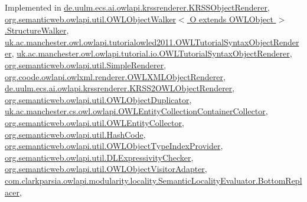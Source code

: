 Implemented in \hyperlink{classde_1_1uulm_1_1ecs_1_1ai_1_1owlapi_1_1krssrenderer_1_1_k_r_s_s_object_renderer_ae1bf57a75ca8f40f6acf0f48e40ccf86}{de.\-uulm.\-ecs.\-ai.\-owlapi.\-krssrenderer.\-K\-R\-S\-S\-Object\-Renderer}, \hyperlink{classorg_1_1semanticweb_1_1owlapi_1_1util_1_1_o_w_l_object_walker_3_01_o_01extends_01_o_w_l_object_01_4_1_1_structure_walker_ad449d316c36af493b88fbccca3876449}{org.\-semanticweb.\-owlapi.\-util.\-O\-W\-L\-Object\-Walker$<$ O extends O\-W\-L\-Object $>$.\-Structure\-Walker}, \hyperlink{classuk_1_1ac_1_1manchester_1_1owl_1_1owlapi_1_1tutorialowled2011_1_1_o_w_l_tutorial_syntax_object_renderer_a9e79e3a998be15e88453ee185bbe2148}{uk.\-ac.\-manchester.\-owl.\-owlapi.\-tutorialowled2011.\-O\-W\-L\-Tutorial\-Syntax\-Object\-Renderer}, \hyperlink{classuk_1_1ac_1_1manchester_1_1owl_1_1owlapi_1_1tutorial_1_1io_1_1_o_w_l_tutorial_syntax_object_renderer_ae4cc13da79d21148a3bd033bd24ebb44}{uk.\-ac.\-manchester.\-owl.\-owlapi.\-tutorial.\-io.\-O\-W\-L\-Tutorial\-Syntax\-Object\-Renderer}, \hyperlink{classorg_1_1semanticweb_1_1owlapi_1_1util_1_1_simple_renderer_a604a1895afc5cbf6e87283a19bb400ac}{org.\-semanticweb.\-owlapi.\-util.\-Simple\-Renderer}, \hyperlink{classorg_1_1coode_1_1owlapi_1_1owlxml_1_1renderer_1_1_o_w_l_x_m_l_object_renderer_accda238584363ee2657bc7f5abf729fb}{org.\-coode.\-owlapi.\-owlxml.\-renderer.\-O\-W\-L\-X\-M\-L\-Object\-Renderer}, \hyperlink{classde_1_1uulm_1_1ecs_1_1ai_1_1owlapi_1_1krssrenderer_1_1_k_r_s_s2_o_w_l_object_renderer_a151b662a8ef0dd90c7bc78a740248c9e}{de.\-uulm.\-ecs.\-ai.\-owlapi.\-krssrenderer.\-K\-R\-S\-S2\-O\-W\-L\-Object\-Renderer}, \hyperlink{classorg_1_1semanticweb_1_1owlapi_1_1util_1_1_o_w_l_object_duplicator_a68f9d86d2a723046c8980bc66b4d1648}{org.\-semanticweb.\-owlapi.\-util.\-O\-W\-L\-Object\-Duplicator}, \hyperlink{classuk_1_1ac_1_1manchester_1_1cs_1_1owl_1_1owlapi_1_1_o_w_l_entity_collection_container_collector_aed342aa606dff09f43b420703825aa47}{uk.\-ac.\-manchester.\-cs.\-owl.\-owlapi.\-O\-W\-L\-Entity\-Collection\-Container\-Collector}, \hyperlink{classorg_1_1semanticweb_1_1owlapi_1_1util_1_1_o_w_l_entity_collector_a141208c281d5e9982c40e2d322644272}{org.\-semanticweb.\-owlapi.\-util.\-O\-W\-L\-Entity\-Collector}, \hyperlink{classorg_1_1semanticweb_1_1owlapi_1_1util_1_1_hash_code_a644e06aba4f2a6a76767211b01c0afce}{org.\-semanticweb.\-owlapi.\-util.\-Hash\-Code}, \hyperlink{classorg_1_1semanticweb_1_1owlapi_1_1util_1_1_o_w_l_object_type_index_provider_a2eedde4ad2a4e5549978100470d3a340}{org.\-semanticweb.\-owlapi.\-util.\-O\-W\-L\-Object\-Type\-Index\-Provider}, \hyperlink{classorg_1_1semanticweb_1_1owlapi_1_1util_1_1_d_l_expressivity_checker_aa8c00fb2b15cd93c78beee15b4d8d63c}{org.\-semanticweb.\-owlapi.\-util.\-D\-L\-Expressivity\-Checker}, \hyperlink{classorg_1_1semanticweb_1_1owlapi_1_1util_1_1_o_w_l_object_visitor_adapter_a50cd43dd9288acb0e7c5ce4bddb9b136}{org.\-semanticweb.\-owlapi.\-util.\-O\-W\-L\-Object\-Visitor\-Adapter}, \hyperlink{classcom_1_1clarkparsia_1_1owlapi_1_1modularity_1_1locality_1_1_semantic_locality_evaluator_1_1_bottom_replacer_a7546502a5ebcb0f937349e540914c7bc}{com.\-clarkparsia.\-owlapi.\-modularity.\-locality.\-Semantic\-Locality\-Evaluator.\-Bottom\-Replacer}, 